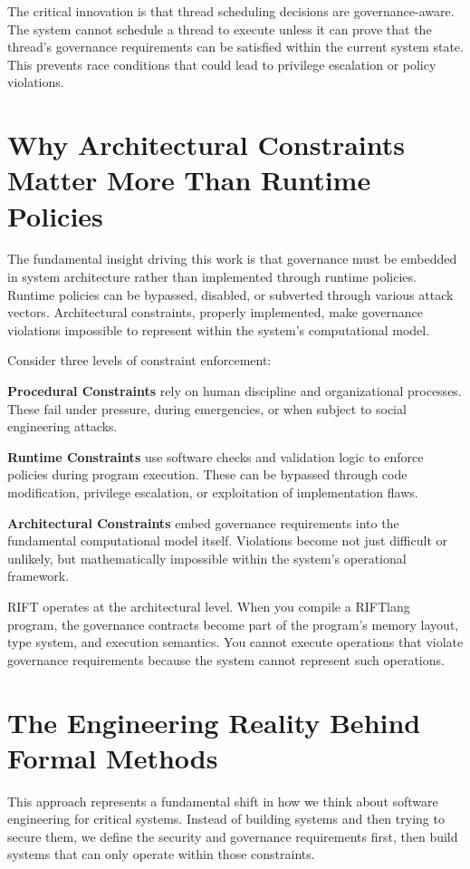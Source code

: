 The critical innovation is that thread scheduling decisions are governance-aware. The system cannot schedule a thread to execute unless it can prove that the thread's governance requirements can be satisfied within the current system state. This prevents race conditions that could lead to privilege escalation or policy violations.

\section*{Why Architectural Constraints Matter More Than Runtime Policies}

The fundamental insight driving this work is that governance must be embedded in system architecture rather than implemented through runtime policies. Runtime policies can be bypassed, disabled, or subverted through various attack vectors. Architectural constraints, properly implemented, make governance violations impossible to represent within the system's computational model.

Consider three levels of constraint enforcement:

\textbf{Procedural Constraints} rely on human discipline and organizational processes. These fail under pressure, during emergencies, or when subject to social engineering attacks.

\textbf{Runtime Constraints} use software checks and validation logic to enforce policies during program execution. These can be bypassed through code modification, privilege escalation, or exploitation of implementation flaws.

\textbf{Architectural Constraints} embed governance requirements into the fundamental computational model itself. Violations become not just difficult or unlikely, but mathematically impossible within the system's operational framework.

RIFT operates at the architectural level. When you compile a RIFTlang program, the governance contracts become part of the program's memory layout, type system, and execution semantics. You cannot execute operations that violate governance requirements because the system cannot represent such operations.

\section*{The Engineering Reality Behind Formal Methods}

This approach represents a fundamental shift in how we think about software engineering for critical systems. Instead of building systems and then trying to secure them, we define the security and governance requirements first, then build systems that can only operate within those constraints.

